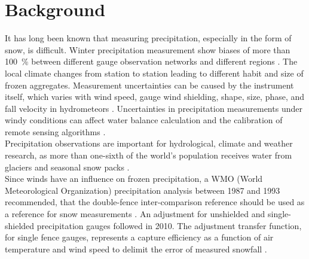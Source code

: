 \section{Background}
It has long been known that measuring precipitation, especially in the form of snow, is difficult. Winter precipitation measurement show biases of more than \SI{100}{\percent} between different gauge observation networks and different regions \citep{kochendorfer_analysis_2017}. The local climate changes from station to station leading to different habit and size of frozen aggregates. Measurement uncertainties can be caused by the instrument itself, which varies with wind speed, gauge wind shielding, shape, size, phase, and fall velocity in hydrometeors \citep{kochendorfer_analysis_2017,wolff_derivation_2015}. 
Uncertainties in precipitation measurements under windy conditions can affect water balance calculation and the calibration of remote sensing algorithms \citep{wolff_derivation_2015}. 
\\
Precipitation observations are important for hydrological, climate and weather research, as more than one-sixth of the world's population receives water from glaciers and seasonal snow packs \citep{barnett_potential_2005}.
\\
Since winds have an influence on frozen precipitation, a WMO (World Meteorological Organization) precipitation analysis between 1987 and 1993 recommended, that the double-fence inter-comparison reference should be used as a reference for snow measurements \citep{goodison_wmo_1998}. An adjustment for unshielded and single-shielded precipitation gauges followed in 2010. The adjustment transfer function, for single fence gauges, represents a capture efficiency as a function of air temperature and wind speed to delimit the error of measured snowfall \citep{kochendorfer_analysis_2017,wolff_derivation_2015}.
\par\medskip
\noindent
